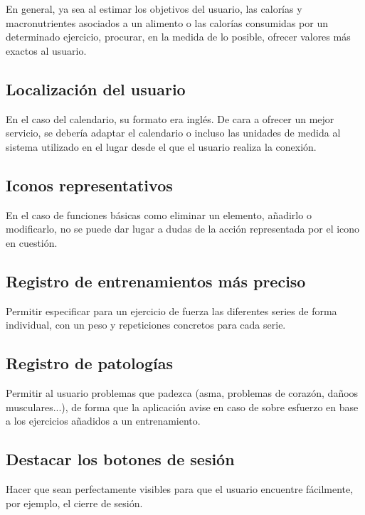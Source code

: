 \documentclass[a4paper]{article}
\begin{document}
	En general, ya sea al estimar los objetivos del usuario, las calorías y macronutrientes asociados a un alimento o las calorías consumidas por un determinado ejercicio, procurar, en la medida de lo posible, ofrecer valores más exactos al usuario.
	
	\subsection{Localización del usuario}
	
	En el caso del calendario, su formato era inglés. De cara a ofrecer un mejor servicio, se debería adaptar el calendario o incluso las unidades de medida al sistema utilizado en el lugar desde el que el usuario realiza la conexión.
	
	\subsection{Iconos representativos}
	
	En el caso de funciones básicas como eliminar un elemento, añadirlo o modificarlo, no se puede dar lugar a dudas de la acción representada por el icono en cuestión.
	
	\subsection{Registro de entrenamientos más preciso}
	
	Permitir especificar para un ejercicio de fuerza las diferentes series de forma individual, con un peso y repeticiones concretos para cada serie.
	
	\subsection{Registro de patologías}
	
	Permitir al usuario problemas que padezca (asma, problemas de corazón, dañoos musculares...), de forma que la aplicación avise en caso de sobre esfuerzo en base a los ejercicios añadidos a un entrenamiento.
	
	\subsection{Destacar los botones de sesión}
	
	Hacer que sean perfectamente visibles para que el usuario encuentre fácilmente, por ejemplo, el cierre de sesión.
\end{document}
